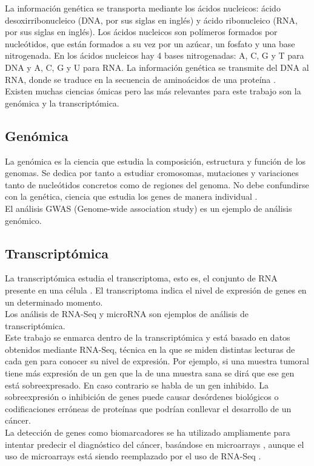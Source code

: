 La información genética se transporta mediante los ácidos nucleicos: ácido desoxirribonucleico (DNA, por sus siglas en inglés) y ácido ribonucleico (RNA, por sus siglas en inglés). Los ácidos nucleicos son polímeros formados por nucleótidos, que están formados a su vez por un azúcar, un fosfato y una base nitrogenada. En los ácidos nucleicos hay 4 bases nitrogenadas: A, C, G y T para DNA y A, C, G y U para RNA. La información genética se transmite del DNA al RNA, donde se traduce en la secuencia de aminoácidos de una proteína \cite{Pierce2010}.\\

Existen muchas ciencias ómicas pero las más relevantes para este trabajo son la genómica y la transcriptómica.

\subsection{Genómica}

La genómica es la ciencia que estudia la composición, estructura y función de los genomas. Se dedica por tanto a estudiar cromosomas, mutaciones y variaciones tanto de nucleótidos concretos como de regiones del genoma. No debe confundirse con la genética, ciencia que estudia los genes de manera individual \cite{Pierce2010}.\\

El análisis GWAS (Genome-wide association study) es un ejemplo de análisis genómico.

\subsection{Transcriptómica}

La transcriptómica estudia el transcriptoma, esto es, el conjunto de RNA presente en una célula \cite{Schmidt2019}. El transcriptoma indica el nivel de expresión de genes en un determinado momento.\\

Los análisis de RNA-Seq y microRNA son ejemplos de análisis de transcriptómica.\\

Este trabajo se enmarca dentro de la transcriptómica y está basado en datos obtenidos mediante RNA-Seq, técnica en la que se miden distintas lecturas de cada gen para conocer su nivel de expresión. Por ejemplo, si una muestra tumoral tiene más expresión de un gen que la de una muestra sana se dirá que ese gen está sobreexpresado. En caso contrario se habla de un gen inhibido. La sobreexpresión o inhibición de genes puede causar desórdenes biológicos o codificaciones erróneas de proteínas que podrían conllevar el desarrollo de un cáncer.\\

La detección de genes como biomarcadores se ha utilizado ampliamente para intentar predecir el diagnóstico del cáncer, basándose en microarrays \cite{Lee2008, Maglietta2007}, aunque el uso de microarrays está siendo reemplazado por el uso de RNA-Seq  \cite{Stark2019, VanVerk2013}.
